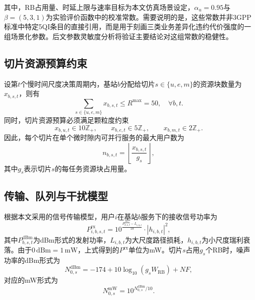 \documentclass[UTF8,a4paper,12pt,fontset=fandol]{ctexart}
\begin{document}
其中，RB占用量、时延上限与速率目标为本文仿真场景设定，$\alpha_u=0.95$与$\beta=(5,3,1)$为实验评价函数中的校准常数。需要说明的是，这些常数并非3GPP标准中特定5QI条目的直接引用，而是用于刻画三类业务差异化违约代价强度的一组场景化参数。后文参数灵敏度分析将验证主要结论对这组常数的稳健性。

\subsection{切片资源预算约束}

设第$t$个慢时间尺度决策周期内，基站$b$分配给切片$s\in\{u,e,m\}$的资源块数量为$x_{b,s,t}$，则有
\begin{equation}
  \sum_{s\in\{u,e,m\}} x_{b,s,t} \le R^{\max}=50,\quad \forall b,t.
\end{equation}
同时，切片资源预算必须满足颗粒度约束
\begin{equation}
  x_{b,u,t}\in 10\mathbb{Z}_+,\qquad
  x_{b,e,t}\in 5\mathbb{Z}_+,\qquad
  x_{b,m,t}\in 2\mathbb{Z}_+.
\end{equation}
因此，每个切片在单个微时隙内可并行服务的最大用户数为
\begin{equation}
  n_{b,s,t} = \left\lfloor \frac{x_{b,s,t}}{g_s}\right\rfloor,
\end{equation}
其中$g_s$表示切片$s$的每任务资源块占用量。

\subsection{传输、队列与干扰模型}

根据本文采用的信号传输模型，用户$i$在基站$b$服务下的接收信号功率为
\begin{equation}
  P^{\text{rx}}_{i,b,s,t} = 10^{\frac{P_{b,s,t}^{\text{dBm}}-L_{i,b,t}}{10}}\cdot |h_{i,b,t}|^2,
\end{equation}
其中$P_{b,s,t}^{\text{dBm}}$为dBm形式的发射功率，$L_{i,b,t}$为大尺度路径损耗，$h_{i,b,t}$为小尺度瑞利衰落。由于$0\,\mathrm{dBm}=1\,\mathrm{mW}$，上式得到的$P^{\text{rx}}$单位为mW。切片$s$占用$g_s$个RB时，噪声功率的dBm形式为
\begin{equation}
  N_{0,s}^{\text{dBm}}=-174+10\log_{10}\left(g_s W_{\text{RB}}\right)+NF,
\end{equation}
对应的mW形式为
\begin{equation}
  N_{0,s}^{\text{mW}}=10^{N_{0,s}^{\text{dBm}}/10}.
\end{equation}
\end{document}
